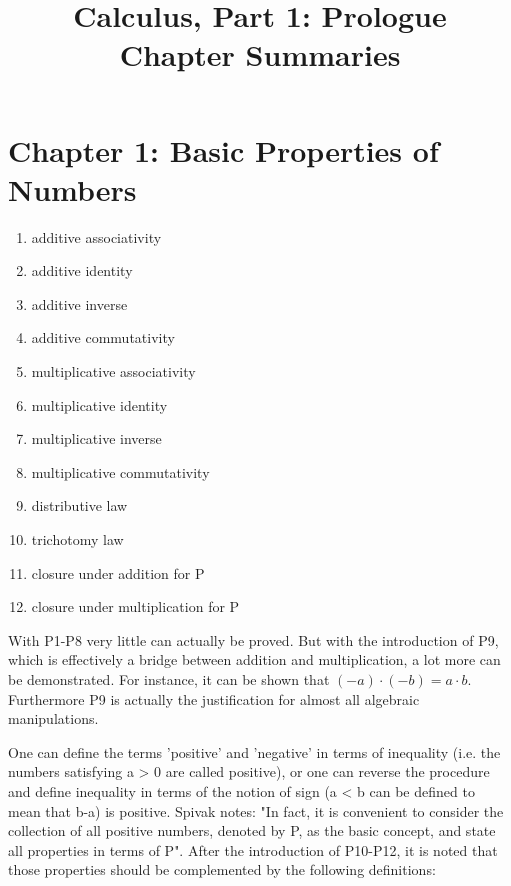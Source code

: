 \documentclass{article}
\begin{document}
\title{%
  Calculus, Part 1: Prologue \\
  \large Chapter Summaries}
\author{}
\date{}
\maketitle

\section*{Chapter 1: Basic Properties of Numbers}

\begin{enumerate}
	\item additive associativity
	\item additive identity
	\item additive inverse
	\item additive commutativity
	\item multiplicative associativity
	\item multiplicative identity
	\item multiplicative inverse
	\item multiplicative commutativity
	\item distributive law
	\item trichotomy law
	\item closure under addition for P
	\item closure under multiplication for P
\end{enumerate}

\begin{flushleft}
With P1-P8 very little can actually be proved. But with the introduction of P9, which is effectively a bridge between addition and multiplication, a lot more can be demonstrated. For instance, it can be shown that $(-a) \cdot (-b) = a \cdot b$. Furthermore P9 is actually the justification for almost all algebraic manipulations.
\end{flushleft}

\begin{flushleft}
One can define the terms 'positive' and 'negative' in terms of inequality (i.e. the numbers satisfying a > 0 are called positive), or one can reverse the procedure and define inequality in terms of the notion of sign (a < b can be defined to mean that b-a) is positive. Spivak notes: "In fact, it is convenient to consider the collection of all positive numbers, denoted by P, as the basic concept, and state all properties in terms of P". After the introduction of P10-P12, it is noted that those properties should be complemented by the following definitions:
\end{flushleft}
\end{document}
